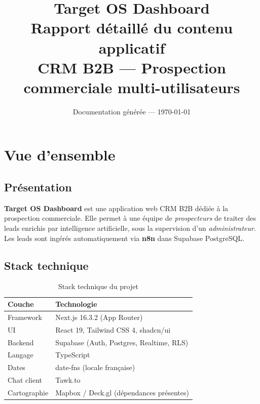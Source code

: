 \documentclass[11pt,a4paper]{report}
\begin{document}
\title{
  \vspace{2cm}
  {\Huge\textbf{Target OS Dashboard}}\\[0.8cm]
  {\LARGE Rapport détaillé du contenu applicatif}\\[0.5cm]
  {\large CRM B2B --- Prospection commerciale multi-utilisateurs}
}
\author{Documentation générée --- \today}
\date{}
\maketitle
\thispagestyle{empty}
\tableofcontents
\newpage

\chapter{Vue d'ensemble}

\section{Présentation}

\textbf{Target OS Dashboard} est une application web CRM B2B dédiée à la prospection commerciale. Elle permet à une équipe de \emph{prospecteurs} de traiter des leads enrichis par intelligence artificielle, sous la supervision d'un \emph{administrateur}. Les leads sont ingérés automatiquement via \textbf{n8n} dans Supabase PostgreSQL.

\section{Stack technique}

\begin{table}[h]
\centering
\begin{tabular}{@{}ll@{}}
\toprule
\textbf{Couche} & \textbf{Technologie} \\
\midrule
Framework & Next.js 16.3.2 (App Router) \\
UI & React 19, Tailwind CSS 4, shadcn/ui \\
Backend & Supabase (Auth, Postgres, Realtime, RLS) \\
Langage & TypeScript \\
Dates & date-fns (locale française) \\
Chat client & Tawk.to \\
Cartographie & Mapbox / Deck.gl (dépendances présentes) \\
\bottomrule
\end{tabular}
\caption{Stack technique du projet}
\end{table}
\end{document}

